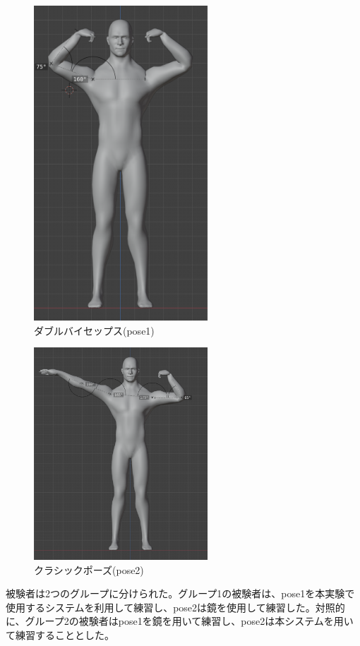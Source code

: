 \begin{figure}[H]
\begin{center}
\includegraphics[width=6.5cm]{figures/pose1.png}
\caption{ダブルバイセップス(pose1)}
\label{fig:pose1}
\end{center}
\end{figure}
\begin{figure}[H]
\begin{center}
\includegraphics[width=6.5cm]{figures/pose2.png}
\caption{クラシックポーズ(pose2)}
\label{fig:pose2}
\end{center}
\end{figure}

被験者は2つのグループに分けられた。グループ1の被験者は、pose1を本実験で使用するシステムを利用して練習し、pose2は鏡を使用して練習した。対照的に、グループ2の被験者はpose1を鏡を用いて練習し、pose2は本システムを用いて練習することとした。


